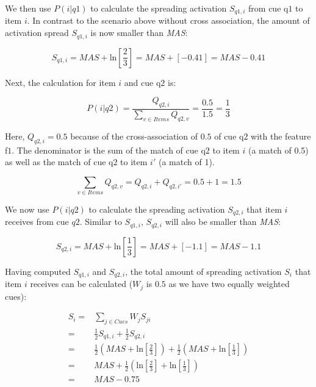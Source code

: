 \documentclass{cambridge7A}\usepackage[]{graphicx}\usepackage[]{color}
\begin{document}
\begin{enumerate}
We then use $P(i|q1)$ to calculate the spreading activation $S_{q1,i}$ from cue q$1$ to item $i$. In contrast to the scenario above without cross association, the amount of activation spread $S_{q1,i}$ is now smaller than \textit{MAS}:

\begin{equation}
S_{q1,i} = \textit{MAS} + \text{ln}\left[\frac{2}{3}\right] =  \textit{MAS} + [-0.41] = \textit{MAS} - 0.41
\end{equation}

Next, the calculation for item $i$ and cue q$2$ is:

\begin{equation} \label{eq:newfannoxassoc4}
	P(i|q2) = \frac{Q_{q2,i}}{\sum\limits_{v\in Items} Q_{q2,v}} = \frac{0.5}{1.5} = \frac{1}{3}
\end{equation}

Here, $Q_{q2,i} = 0.5$ because of the cross-association of $0.5$ of  cue q$2$ with the feature f$1$. The denominator is the sum of the match of cue q$2$ to item $i$ (a match of 0.5) as well as the match of cue q$2$ to item $i'$ (a match of 1).

\begin{equation}
\sum\limits_{v\in Items} Q_{q2,v} = Q_{q2,i} + Q_{q2,i'} = 0.5 + 1 = 1.5
\end{equation}

We now use $P(i|q2)$ to calculate the spreading activation  $S_{q2,i}$ that item $i$ receives from cue $q2$. Similar to  $S_{q1,i}$, $S_{q2,i}$ will also be smaller than \textit{MAS}: 


\begin{equation}
S_{q2,i} = \textit{MAS} + \text{ln}\left[\frac{1}{3} \right] = \textit{MAS} + [-1.1] = \textit{MAS} - 1.1 
\end{equation}

Having computed $S_{q1,i}$ and $S_{q2,i}$, the total amount of spreading activation $S_i$ that item $i$ receives can be calculated ($W_j$ is $0.5$ as we have two equally weighted cues):

\begin{equation}
\begin{split}
      S_i =& \sum\limits_{j\in Cues} W_{j} S_{ji} \\
          =& \frac{1}{2} S_{q1,i} + \frac{1}{2} S_{q2,i}\\
          =& \frac{1}{2}\left(\textit{MAS} + \text{ln}\left[\frac{2}{3}\right]\right) + \frac{1}{2}\left(\textit{MAS} + \text{ln}\left[\frac{1}{3}\right]\right)\\
          =& \textit{MAS} +  \frac{1}{2}\left(\text{ln}\left[\frac{2}{3}\right] + \text{ln}\left[\frac{1}{3}\right]\right) \\
          =& \textit{MAS} - 0.75
\end{split}
\end{equation}


\end{enumerate}
\end{document}
